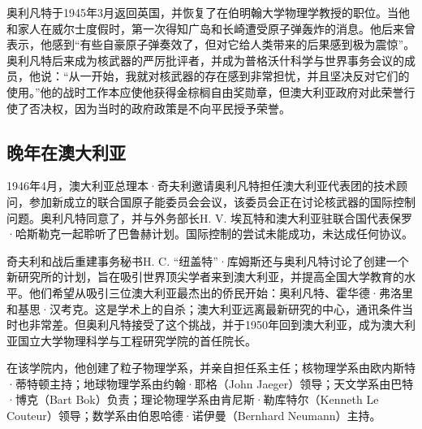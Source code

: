 奥利凡特于1945年3月返回英国，并恢复了在伯明翰大学物理学教授的职位。当他和家人在威尔士度假时，第一次得知广岛和长崎遭受原子弹轰炸的消息。他后来曾表示，他感到“有些自豪原子弹奏效了，但对它给人类带来的后果感到极为震惊”。奥利凡特后来成为核武器的严厉批评者，并成为普格沃什科学与世界事务会议的成员，他说：“从一开始，我就对核武器的存在感到非常担忧，并且坚决反对它们的使用。”他的战时工作本应使他获得金棕榈自由奖勋章，但澳大利亚政府对此荣誉行使了否决权，因为当时的政府政策是不向平民授予荣誉。
\subsection{晚年在澳大利亚}
1946年4月，澳大利亚总理本·奇夫利邀请奥利凡特担任澳大利亚代表团的技术顾问，参加新成立的联合国原子能委员会会议，该委员会正在讨论核武器的国际控制问题。奥利凡特同意了，并与外务部长H. V. 埃瓦特和澳大利亚驻联合国代表保罗·哈斯勒克一起聆听了巴鲁赫计划。国际控制的尝试未能成功，未达成任何协议。

奇夫利和战后重建事务秘书H. C. “纽盖特”·库姆斯还与奥利凡特讨论了创建一个新研究所的计划，旨在吸引世界顶尖学者来到澳大利亚，并提高全国大学教育的水平。他们希望从吸引三位澳大利亚最杰出的侨民开始：奥利凡特、霍华德·弗洛里和基思·汉考克。这是学术上的自杀；澳大利亚远离最新研究的中心，通讯条件当时也非常差。但奥利凡特接受了这个挑战，并于1950年回到澳大利亚，成为澳大利亚国立大学物理科学与工程研究学院的首任院长。

在该学院内，他创建了粒子物理学系，并亲自担任系主任；核物理学系由欧内斯特·蒂特顿主持；地球物理学系由约翰·耶格（John Jaeger）领导；天文学系由巴特·博克（Bart Bok）负责；理论物理学系由肯尼斯·勒库特尔（Kenneth Le Couteur）领导；数学系由伯恩哈德·诺伊曼（Bernhard Neumann）主持。
